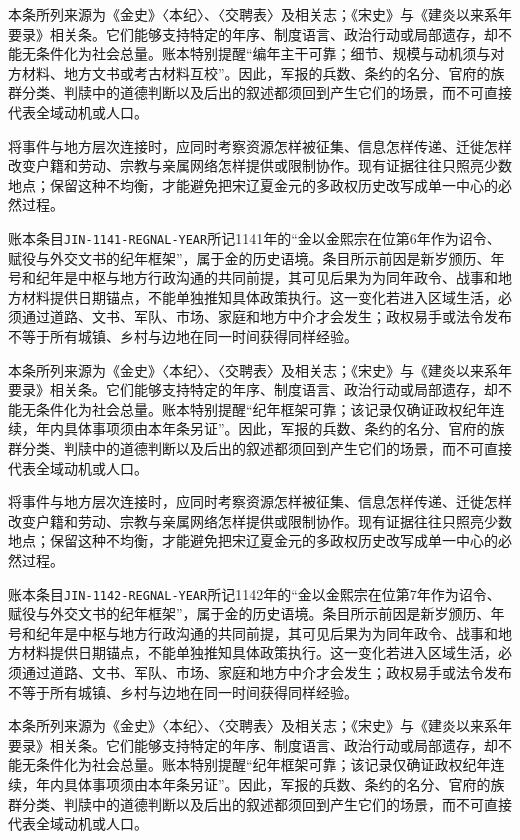 本条所列来源为《金史》〈本纪〉、〈交聘表〉及相关志；《宋史》与《建炎以来系年要录》相关条。它们能够支持特定的年序、制度语言、政治行动或局部遗存，却不能无条件化为社会总量。账本特别提醒“编年主干可靠；细节、规模与动机须与对方材料、地方文书或考古材料互校”。因此，军报的兵数、条约的名分、官府的族群分类、判牍中的道德判断以及后出的叙述都须回到产生它们的场景，而不可直接代表全域动机或人口。

将事件与地方层次连接时，应同时考察资源怎样被征集、信息怎样传递、迁徙怎样改变户籍和劳动、宗教与亲属网络怎样提供或限制协作。现有证据往往只照亮少数地点；保留这种不均衡，才能避免把宋辽夏金元的多政权历史改写成单一中心的必然过程。

账本条目\texttt{JIN-1141-REGNAL-YEAR}所记1141年的“金以金熙宗在位第6年作为诏令、赋役与外交文书的纪年框架”，属于金的历史语境。条目所示前因是新岁颁历、年号和纪年是中枢与地方行政沟通的共同前提，其可见后果为为同年政令、战事和地方材料提供日期锚点，不能单独推知具体政策执行。这一变化若进入区域生活，必须通过道路、文书、军队、市场、家庭和地方中介才会发生；政权易手或法令发布不等于所有城镇、乡村与边地在同一时间获得同样经验。

本条所列来源为《金史》〈本纪〉、〈交聘表〉及相关志；《宋史》与《建炎以来系年要录》相关条。它们能够支持特定的年序、制度语言、政治行动或局部遗存，却不能无条件化为社会总量。账本特别提醒“纪年框架可靠；该记录仅确证政权纪年连续，年内具体事项须由本年条另证”。因此，军报的兵数、条约的名分、官府的族群分类、判牍中的道德判断以及后出的叙述都须回到产生它们的场景，而不可直接代表全域动机或人口。

将事件与地方层次连接时，应同时考察资源怎样被征集、信息怎样传递、迁徙怎样改变户籍和劳动、宗教与亲属网络怎样提供或限制协作。现有证据往往只照亮少数地点；保留这种不均衡，才能避免把宋辽夏金元的多政权历史改写成单一中心的必然过程。

账本条目\texttt{JIN-1142-REGNAL-YEAR}所记1142年的“金以金熙宗在位第7年作为诏令、赋役与外交文书的纪年框架”，属于金的历史语境。条目所示前因是新岁颁历、年号和纪年是中枢与地方行政沟通的共同前提，其可见后果为为同年政令、战事和地方材料提供日期锚点，不能单独推知具体政策执行。这一变化若进入区域生活，必须通过道路、文书、军队、市场、家庭和地方中介才会发生；政权易手或法令发布不等于所有城镇、乡村与边地在同一时间获得同样经验。

本条所列来源为《金史》〈本纪〉、〈交聘表〉及相关志；《宋史》与《建炎以来系年要录》相关条。它们能够支持特定的年序、制度语言、政治行动或局部遗存，却不能无条件化为社会总量。账本特别提醒“纪年框架可靠；该记录仅确证政权纪年连续，年内具体事项须由本年条另证”。因此，军报的兵数、条约的名分、官府的族群分类、判牍中的道德判断以及后出的叙述都须回到产生它们的场景，而不可直接代表全域动机或人口。

